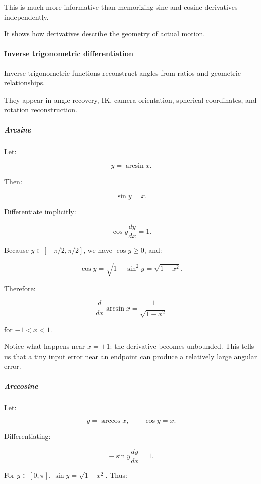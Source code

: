 This is much more informative than memorizing sine and cosine derivatives independently.

It shows how derivatives describe the geometry of actual motion.

\paragraph{Inverse trigonometric differentiation}\label{01-foundations-i-ch020-inverse-trigonometric-differentiation}

\hypertarget{01-foundations-i-ch020-inverse-trigonometric-differentiation}{}

Inverse trigonometric functions reconstruct angles from ratios and geometric relationships.

They appear in angle recovery, IK, camera orientation, spherical coordinates, and rotation reconstruction.

\subparagraph{Arcsine}\label{01-foundations-i-ch020-arcsine}

\hypertarget{01-foundations-i-ch020-arcsine}{}

Let:

\[
y=\arcsin x.
\]

Then:

\[
\sin y=x.
\]

Differentiate implicitly:

\[
\cos y\frac{dy}{dx}=1.
\]

Because \(y\in[-\pi/2,\pi/2]\), we have \(\cos y\ge0\), and:

\[
\cos y=\sqrt{1-\sin^2y}=\sqrt{1-x^2}.
\]

Therefore:

\[
\boxed{\frac d{dx}\arcsin x=\frac1{\sqrt{1-x^2}}}
\]

for \(-1<x<1\).

Notice what happens near \(x=\pm1\): the derivative becomes unbounded. This tells us that a tiny input error near an endpoint can produce a relatively large angular error.

\subparagraph{Arccosine}\label{01-foundations-i-ch020-arccosine}

\hypertarget{01-foundations-i-ch020-arccosine}{}

Let:

\[
y=\arccos x,\qquad\cos y=x.
\]

Differentiating:

\[
-\sin y\frac{dy}{dx}=1.
\]

For \(y\in[0,\pi]\), \(\sin y=\sqrt{1-x^2}\). Thus:

